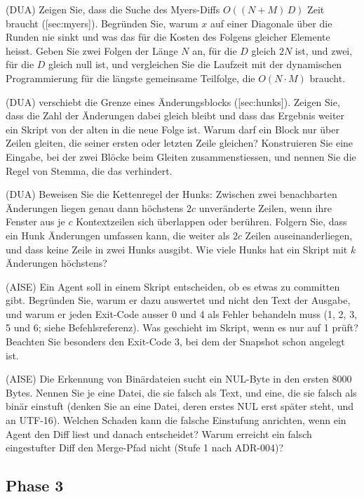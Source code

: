 \startitemize[n]
\item (DUA) Zeigen Sie, dass die Suche des Myers-Diffs $O((N+M)\,D)$ Zeit braucht
([sec:myers]).
Begründen Sie, warum $x$ auf einer Diagonale über die Runden nie sinkt
und was das für die Kosten des Folgens gleicher Elemente heisst.
Geben Sie zwei Folgen der Länge $N$ an, für die $D$ gleich $2N$ ist, und zwei, für die $D$ gleich
null ist, und vergleichen Sie die Laufzeit mit der dynamischen Programmierung für die längste
gemeinsame Teilfolge, die $O(N \cdot M)$ braucht.
\item (DUA)  verschiebt die Grenze eines Änderungsblocks ([sec:hunks]).
Zeigen Sie, dass die Zahl der Änderungen dabei gleich bleibt und dass das Ergebnis weiter ein
Skript von der alten in die neue Folge ist.
Warum darf ein Block nur über Zeilen gleiten, die seiner ersten oder letzten Zeile gleichen?
Konstruieren Sie eine Eingabe, bei der zwei Blöcke beim Gleiten zusammenstiessen,
und nennen Sie die Regel von Stemma, die das verhindert.
\item (DUA) Beweisen Sie die Kettenregel der Hunks: Zwischen zwei benachbarten Änderungen liegen
genau dann höchstens $2c$ unveränderte Zeilen, wenn ihre Fenster aus je $c$ Kontextzeilen sich
überlappen oder berühren. Folgern Sie, dass ein Hunk Änderungen umfassen kann, die weiter als
$2c$ Zeilen auseinanderliegen, und dass  keine Zeile in zwei Hunks ausgibt.
Wie viele Hunks hat ein Skript mit $k$ Änderungen höchstens?
\item (AISE) Ein Agent soll in einem Skript entscheiden, ob es etwas zu committen gibt.
Begründen Sie, warum er dazu  auswertet und nicht den Text der Ausgabe,
und warum er jeden Exit-Code ausser 0 und 4 als Fehler behandeln muss
(1, 2, 3, 5 und 6; siehe Befehlsreferenz).
Was geschieht im Skript, wenn es nur auf 1 prüft?
Beachten Sie besonders den Exit-Code 3, bei dem der Snapshot schon angelegt ist.
\item (AISE) Die Erkennung von Binärdateien sucht ein NUL-Byte in den ersten 8000 Bytes.
Nennen Sie je eine Datei, die sie falsch als Text, und eine, die sie falsch als binär einstuft
(denken Sie an eine Datei, deren erstes NUL erst später steht, und an UTF-16).
Welchen Schaden kann die falsche Einstufung anrichten, wenn ein Agent den Diff liest
und danach entscheidet?
Warum erreicht ein falsch eingestufter Diff den Merge-Pfad nicht (Stufe 1 nach ADR-004)?
\stopitemize

\subsection{Phase 3}

